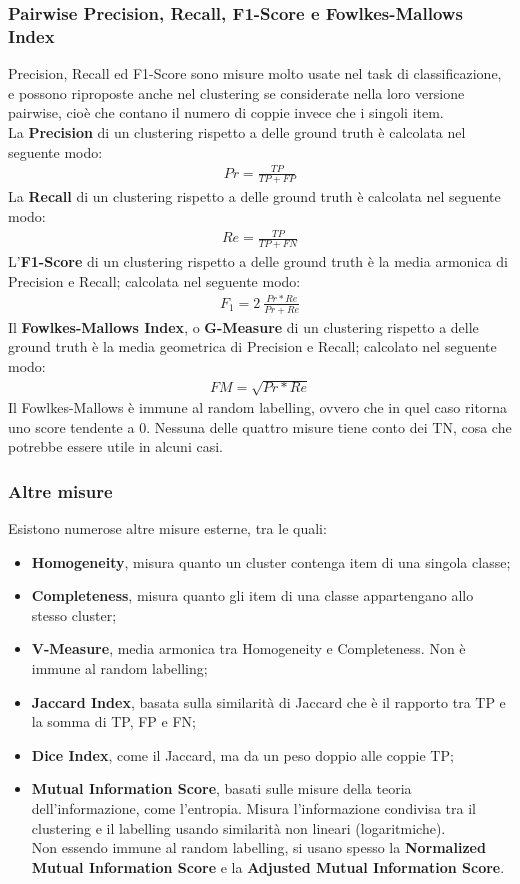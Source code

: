 \subsubsection{Pairwise Precision, Recall, F1-Score e Fowlkes-Mallows Index}
Precision, Recall ed F1-Score sono misure molto usate nel task di classificazione, e possono riproposte anche nel clustering se considerate nella loro versione pairwise, cioè che contano il numero di coppie invece che i singoli item.\\
La \textbf{Precision} di un clustering rispetto a delle ground truth è calcolata nel seguente modo:
\begin{align}
	Pr = \frac{TP}{TP + FP}
\end{align}
La \textbf{Recall} di un clustering rispetto a delle ground truth è calcolata nel seguente modo:
\begin{align}
	Re = \frac{TP}{TP + FN}
\end{align}
L'\textbf{F1-Score} di un clustering rispetto a delle ground truth è la media armonica di Precision e Recall; calcolata nel seguente modo:
\begin{align}
	F_1 = 2\:\frac{Pr * Re}{Pr + Re}
\end{align}
Il \textbf{Fowlkes-Mallows Index}, o \textbf{G-Measure} di un clustering rispetto a delle ground truth è la media geometrica di Precision e Recall; calcolato nel seguente modo:
\begin{align}
	FM = \sqrt{Pr * Re}
\end{align}
Il Fowlkes-Mallows è immune al random labelling, ovvero che in quel caso ritorna uno score tendente a 0.
Nessuna delle quattro misure tiene conto dei TN, cosa che potrebbe essere utile in alcuni casi.

\subsubsection{Altre misure}
Esistono numerose altre misure esterne, tra le quali:
\begin{itemize}
	\item \textbf{Homogeneity}, misura quanto un cluster contenga item di una singola classe;
	\item \textbf{Completeness}, misura quanto gli item di una classe appartengano allo stesso cluster;
	\item \textbf{V-Measure}, media armonica tra Homogeneity e Completeness. Non è immune al random labelling;
	\item \textbf{Jaccard Index}, basata sulla similarità di Jaccard che è il rapporto tra TP e la somma di TP, FP e FN;
	\item \textbf{Dice Index}, come il Jaccard, ma da un peso doppio alle coppie TP;
	\item \textbf{Mutual Information Score}, basati sulle misure della teoria dell'informazione, come l'entropia. Misura l'informazione condivisa tra il clustering e il labelling usando similarità non lineari (logaritmiche).\\
	Non essendo immune al random labelling, si usano spesso la \textbf{Normalized Mutual Information Score} e la \textbf{Adjusted Mutual Information Score}.
\end{itemize}

